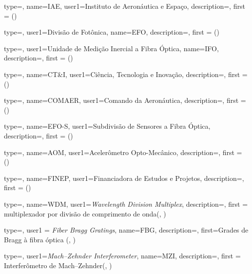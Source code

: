 {type=\acronymtype,
  name={IAE},
  user1={Instituto de Aeronáutica e Espaço},
  description={},
  first = { ()}
}

{type=\acronymtype,
  user1=Divisão de Fotônica,
  name={EFO},
  description={},
  first = {  ()}
}


{type=\acronymtype,
  user1=Unidade de Medição Inercial a Fibra Óptica,
  name={IFO},
  description={},
  first = {  ()}
}

{type=\acronymtype,
  name={CT\&I},
  user1={Ciência, Tecnologia e Inovação},
  description={},
  first = { ()}
}

{type=\acronymtype,
  name={COMAER},
  user1={Comando da Aeronáutica},
  description={},
  first = { ()}
}

{type=\acronymtype,
  name={EFO-S},
  user1={Subdivisão de Sensores a Fibra Óptica},
  description={},
  first = { ()}
}

{type=\acronymtype,
  name={AOM},
  user1={Acelerômetro Opto-Mecânico},
  description={},
  first = { ()}
}

{type=\acronymtype,
  name={FINEP},
  user1={Financiadora de Estudos e Projetos},
  description={},
  first = { ()}
}

{type=\acronymtype,
  name={WDM},
  user1={\emph{Wavelength Division Multiplex}},
  description={},
  first = {multiplexador por divisão de comprimento de onda(, )}
}

{type=\acronymtype,
  user1 = {\emph{Fiber Bragg Gratings}},
  name={FBG},
  description={},
  first={Grades de Bragg à fibra óptica (, )}
}

{type=\acronymtype,
  user1=\emph{Mach--Zehnder Interferometer},
  name={MZI},
  description={},
  first = {Interferômetro de Mach--Zehnder(, )}
}

